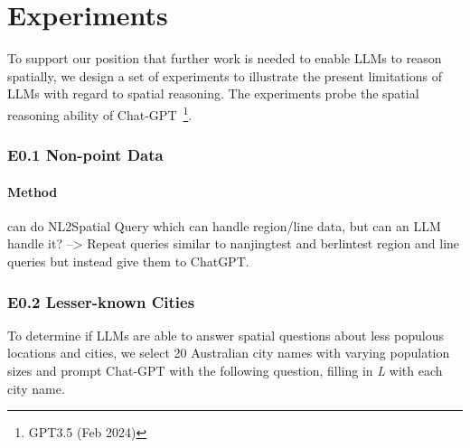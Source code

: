 \section{Experiments}
\label{section:experiments}


To support our position that further work is needed to enable LLMs to reason spatially, we design a set of experiments to illustrate the present limitations of LLMs with regard to spatial reasoning.
The experiments probe the spatial reasoning ability of Chat-GPT~\footnote{GPT3.5 (Feb 2024)}.




\subsubsection{E0.1 Non-point Data}
\paragraph{Method}
\cite{Liu2023} can do NL2Spatial Query which can handle region/line data, but can an LLM handle it?
--> Repeat queries similar to \cite{Liu2023} nanjingtest and berlintest region and line queries but instead give them to ChatGPT.



\subsubsection{E0.2 Lesser-known Cities}
To determine if LLMs are able to answer spatial questions about less populous locations and cities, we select 20 Australian city names with varying population sizes and prompt Chat-GPT with the following question, filling in \textit{L} with each city name.

